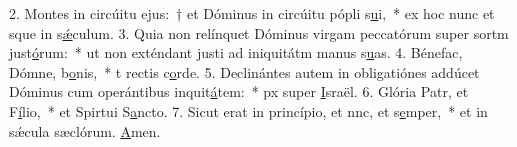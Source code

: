 2. Montes in circúitu ejus:~† et Dóminus in circúitu pópli s\uline{u}i,~* ex hoc nunc et sque in s\uline{ǽ}culum.
3. Quia non relínquet Dóminus virgam peccatórum super sortm just\uline{ó}rum:~* ut non exténdant justi ad iniquitátm manus s\uline{u}as.
4. Bénefac, Dómne, b\uline{o}nis,~* t rectis c\uline{o}rde.
5. Declinántes autem in obligatiónes addúcet Dóminus cum operántibus inquit\uline{á}tem:~* px super \uline{I}sraël.
6. Glória Patr, et F\uline{í}lio,~* et Spirtui S\uline{a}ncto.
7. Sicut erat in princípio, et nnc, et s\uline{e}mper,~* et in sǽcula sæclórum. \uline{A}men.

